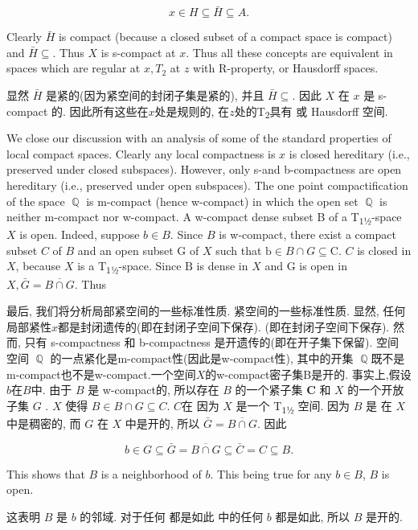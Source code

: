 \documentclass[options]{article}
\begin{document}
\[
		x \in H \subseteq \bar{H} \subseteq A .
\]
\begin{paracol}{2}
	\begin{en}
		Clearly $\bar{H}$ is compact (because a closed subset of a compact space is compact) and
		$\bar{H} \subseteq$. Thus $X$ is s-compact at $x$. Thus all these
		concepts are equivalent in spaces which are regular at $x, T_2$ at $z$ with
		R-property, or Hausdorff spaces.
	\end{en}
	\begin{cn}
		显然 $\bar{H}$ 是紧的(因为紧空间的封闭子集是紧的), 并且
		$\bar{H} \subseteq$. 因此 $X$ 在 $x$ 是 s-compact 的. 因此所有这些在$x$处是规则的, 在$z$处的T\textsubscript{\!$2$}具有
		或 Hausdorff 空间. \end{cn}

	\begin{en}
		We close our discussion with an analysis of some of the standard properties of local
		compact spaces. Clearly any local compactness is $x$ is closed hereditary
		(i.e., preserved under closed subspaces). However, only s-and b-compactness are open
		hereditary (i.e., preserved under open subspaces). The one point compactification of the
		space $\BbbQ$ is m-compact (hence w-compact) in which the open set
		$\BbbQ$ is neither m-compact nor w-compact. A w-compact dense
		subset B of a T\textsubscript{\!$1$½}-space $X$ is open.
		Indeed, suppose $b \in B$. Since $B$ is w-compact, there exist
		a compact subset $C$ of $B$ and an open subset $\mathrm{G}$ of
		$X$ such that $\mathrm{b} \in B \cap G \subseteq \mathrm{C}$. $C$ is closed in
		$X$, because $X$ is a T\textsubscript{\!$1$½}-space. Since $\mathrm{B}$ is
		dense in $X$ and $\mathrm{G}$ is open in $X, \bar{G}=\overline{B \cap
			G}$. Thus
	\end{en}
	\begin{cn}
		最后, 我们将分析局部紧空间的一些标准性质.
		紧空间的一些标准性质. 显然, 任何局部紧性$x$都是封闭遗传的(即在封闭子空间下保存).
		(即在封闭子空间下保存). 然而, 只有 s-compactness 和 b-compactness 是开遗传的(即在开子集下保留). 空间
		空间 $\BbbQ$ 的一点紧化是m-compact性(因此是w-compact性), 其中的开集
		$\BbbQ$既不是m-compact也不是w-compact.一个空间$X$的w-compact密子集B是开的.
		事实上,假设$b$在$B$中. 由于 $B$ 是 w-compact的, 所以存在
		$B$ 的一个紧子集 $\mathbf{C}$ 和 $X$ 的一个开放子集 $G$ .
		${X}$ 使得 $B \in B \cap G \subseteq C$. $C$在
		因为 $X$ 是一个 T\textsubscript{\!$1$½} 空间. 因为 $B$ 是
		在 $X$ 中是稠密的, 而 $G$ 在 $X$ 中是开的, 所以 $\bar{G}=\overline{B \cap
			G}$. 因此
	\end{cn}
\end{paracol}
\[
		b \in G \subseteq \bar{G}=\overline{B \cap G} \subseteq \bar{C}=C \subseteq B .
\]
\begin{paracol}{2}

	\begin{en}
		This shows that $B$ is a neighborhood of $b$. This being true for any
		$b \in B$, $B$ is open.
	\end{en}
	\begin{cn}
		这表明 $B$ 是 $b$ 的邻域. 对于任何
		都是如此 中的任何 $b$ 都是如此, 所以 $B$ 是开的.
	\end{cn}
\end{paracol}
\end{document}
